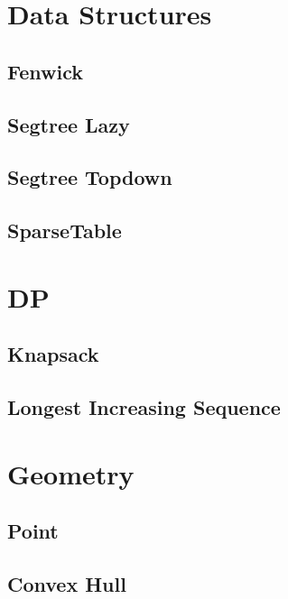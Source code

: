 \section{Data Structures}
\subsection{Fenwick}
\raggedbottom
\hrulefill
\subsection{Segtree Lazy}
\raggedbottom
\hrulefill
\subsection{Segtree Topdown}
\raggedbottom
\hrulefill
\subsection{SparseTable}
\raggedbottom
\hrulefill

\section{DP}
\subsection{Knapsack}
\raggedbottom
\hrulefill
\subsection{Longest Increasing Sequence}
\raggedbottom
\hrulefill

\section{Geometry}
\subsection{Point}
\raggedbottom
\hrulefill
\subsection{Convex Hull}
\raggedbottom
\hrulefill

